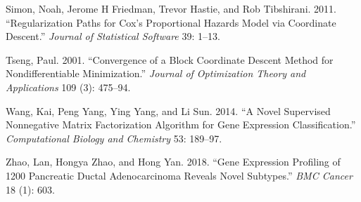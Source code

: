 \documentclass[
]{article}
\newlength{\cslhangindent}
\newenvironment{CSLReferences}[2] %
 {\begin{list}{}{%
  \setlength{\itemindent}{0pt}
  \setlength{\leftmargin}{0pt}
  \setlength{\parsep}{0pt}
  \ifodd #1
   \setlength{\leftmargin}{\cslhangindent}
   \setlength{\itemindent}{-1\cslhangindent}
  \fi
  \setlength{\itemsep}{#2\baselineskip}}}
 {\end{list}}
\begin{document}
\begin{CSLReferences}{1}{0}
Simon, Noah, Jerome H Friedman, Trevor Hastie, and Rob Tibshirani. 2011.
{``Regularization Paths for Cox's Proportional Hazards Model via
Coordinate Descent.''} \emph{Journal of Statistical Software} 39: 1--13.

Tseng, Paul. 2001. {``Convergence of a Block Coordinate Descent Method
for Nondifferentiable Minimization.''} \emph{Journal of Optimization
Theory and Applications} 109 (3): 475--94.

Wang, Kai, Peng Yang, Ying Yang, and Li Sun. 2014. {``A Novel Supervised
Nonnegative Matrix Factorization Algorithm for Gene Expression
Classification.''} \emph{Computational Biology and Chemistry} 53:
189--97.

Zhao, Lan, Hongya Zhao, and Hong Yan. 2018. {``Gene Expression Profiling
of 1200 Pancreatic Ductal Adenocarcinoma Reveals Novel Subtypes.''}
\emph{BMC Cancer} 18 (1): 603.

\end{CSLReferences}
\end{document}
